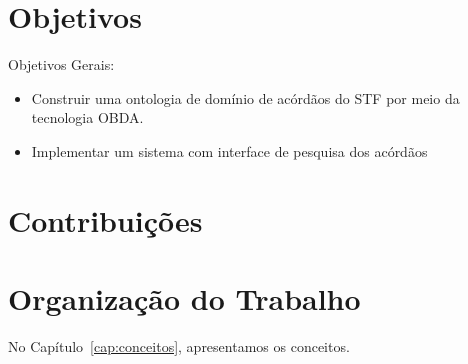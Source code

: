 \section{Objetivos}
\label{sec:objetivo}

Objetivos Gerais:

\begin{itemize}
    \item Construir uma ontologia de domínio de acórdãos do STF por meio da tecnologia OBDA.
    
    \item Implementar um sistema com interface de pesquisa dos acórdãos
\end{itemize}

\section{Contribuições}
\label{sec:contribucoes}



\section{Organização do Trabalho}
\label{sec:organizacao_trabalho}

No Capítulo~\ref{cap:conceitos}, apresentamos os conceitos.


